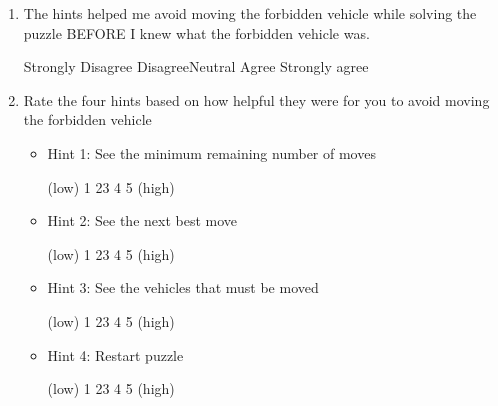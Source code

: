 \begin{enumerate}[topsep=-4em]
\begin{itemize}[topsep=-6em, label={o}]
\end{itemize}
\item The hints helped me avoid moving the forbidden vehicle while solving the puzzle BEFORE I knew what the forbidden vehicle was.
\par Strongly Disagree \hspace{1cm} Disagree\hspace{1cm}Neutral\hspace{1cm} Agree\hspace{1cm} Strongly agree
\item Rate the four hints based on how helpful they were for you to avoid moving the forbidden vehicle
\begin{itemize}[topsep=-6em, label={o}]
\itemsep-1em 
\item Hint 1: See the minimum remaining number of moves
\par (low) \hspace{0.5cm}1 \hspace{1cm} 2\hspace{1cm}3\hspace{1cm} 4\hspace{1cm} 5 \hspace{0.5cm} (high)
\item Hint 2: See the next best move 
\par (low) \hspace{0.5cm}1 \hspace{1cm} 2\hspace{1cm}3\hspace{1cm} 4\hspace{1cm} 5 \hspace{0.5cm} (high)
\item Hint 3: See the vehicles that must be moved
\par (low) \hspace{0.5cm}1 \hspace{1cm} 2\hspace{1cm}3\hspace{1cm} 4\hspace{1cm} 5 \hspace{0.5cm} (high)
\item Hint 4: Restart puzzle
\par (low) \hspace{0.5cm}1 \hspace{1cm} 2\hspace{1cm}3\hspace{1cm} 4\hspace{1cm} 5 \hspace{0.5cm} (high)
\end{itemize}

\end{enumerate}